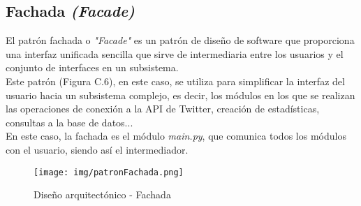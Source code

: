 \subsection{Fachada \textit{(Facade)}}
El patrón fachada o \textit{"Facade"} es un patrón de diseño de software que proporciona una interfaz unificada sencilla que sirve de intermediaria entre los usuarios y el conjunto de interfaces en un subsistema.\cite{fachada}\\
Este patrón (Figura C.6), en este caso, se utiliza para simplificar la interfaz del usuario hacia un subsistema complejo, es decir, los módulos en los que se realizan las operaciones de conexión a la API de Twitter, creación de estadísticas, consultas a la base de datos... \\
En este caso, la fachada es el módulo \textit{main.py}, que comunica todos los módulos con el usuario, siendo así el intermediador.
\begin{figure}[h!]
    \centering
    \texttt{[image: img/patronFachada.png]} \\
    \caption{Diseño arquitectónico - Fachada}
    \label{Diseño arquitectónico - Fachada}
\end{figure}
